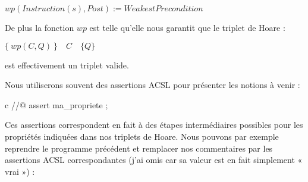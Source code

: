 $wp(Instruction(s), Post) := WeakestPrecondition$



De plus la fonction $wp$ est telle qu'elle nous garantit que le triplet de Hoare :




\begin{center}
$\{\ wp(C,Q)\ \}\quad C\quad \{ Q \}$


\end{center}


est effectivement un triplet valide.



Nous utiliserons souvent des assertions ACSL pour présenter les notions à 
venir :



\begin{CodeBlock}{c}
//@ assert ma_propriete ;
\end{CodeBlock}



Ces assertions correspondent en fait à des étapes intermédiaires possibles pour
les propriétés indiquées dans nos triplets de Hoare. Nous pouvons par exemple
reprendre le programme précédent et remplacer nos commentaires par les assertions
ACSL correspondantes (j'ai omis  car sa valeur est en fait simplement
« vrai ») :





